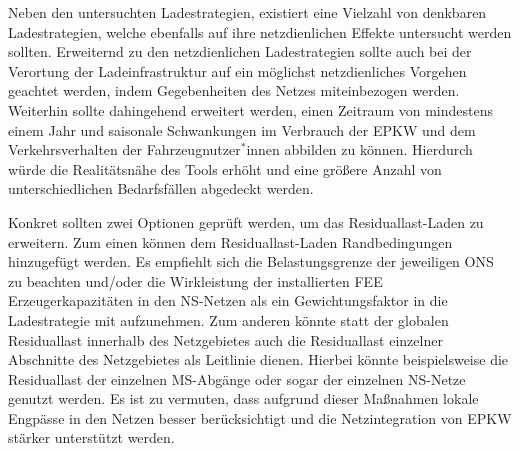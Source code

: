 Neben den untersuchten Ladestrategien, existiert eine Vielzahl von denkbaren Ladestrategien, welche ebenfalls auf ihre netzdienlichen Effekte untersucht werden sollten.
Erweiternd zu den netzdienlichen Ladestrategien sollte auch bei der Verortung der Ladeinfrastruktur auf ein möglichst netzdienliches Vorgehen geachtet werden, indem Gegebenheiten des Netzes miteinbezogen werden.
Weiterhin sollte  dahingehend erweitert werden, einen Zeitraum von mindestens einem Jahr und saisonale Schwankungen im Verbrauch der \gls{EPKW} und dem Verkehrsverhalten der Fahrzeugnutzer\(^*\)innen abbilden zu können.
Hierdurch würde die Realitätsnähe des Tools erhöht und eine größere Anzahl von unterschiedlichen Bedarfsfällen abgedeckt werden.\medskip

Konkret sollten zwei Optionen geprüft werden, um das Residuallast-Laden zu erweitern.
Zum einen können dem Residuallast-Laden Randbedingungen hinzugefügt werden.
Es empfiehlt sich die Belastungsgrenze der jeweiligen \gls{ONS} zu beachten und/oder die Wirkleistung der installierten \gls{FEE} Erzeugerkapazitäten in den \gls{NS}-Netzen als ein Gewichtungsfaktor in die Ladestrategie mit aufzunehmen.
Zum anderen könnte statt der globalen Residuallast innerhalb des Netzgebietes auch die Residuallast einzelner Abschnitte des Netzgebietes als Leitlinie dienen.
Hierbei könnte beispielsweise die Residuallast der einzelnen \gls{MS}-Abgänge oder sogar der einzelnen \gls{NS}-Netze genutzt werden.
Es ist zu vermuten, dass aufgrund dieser Maßnahmen lokale Engpässe in den Netzen besser berücksichtigt und die Netzintegration von \gls{EPKW} stärker unterstützt werden.

